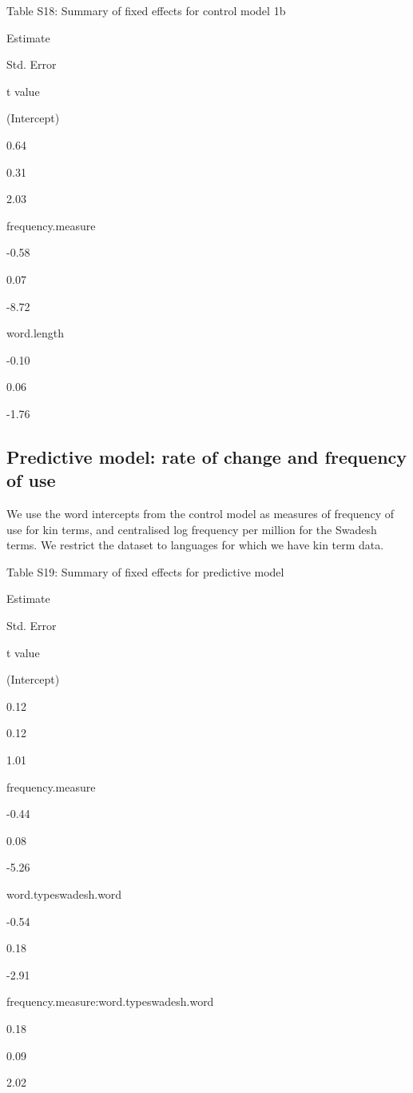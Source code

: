 \documentclass[]{article}
\begin{document}
Table S18: Summary of fixed effects for control model 1b

Estimate

Std. Error

t value

(Intercept)

0.64

0.31

2.03

frequency.measure

-0.58

0.07

-8.72

word.length

-0.10

0.06

-1.76

\subsection{Predictive model: rate of change and frequency of
use}\label{predictive-model-rate-of-change-and-frequency-of-use}

We use the word intercepts from the control model as measures of
frequency of use for kin terms, and centralised log frequency per
million for the Swadesh terms. We restrict the dataset to languages for
which we have kin term data.

Table S19: Summary of fixed effects for predictive model

Estimate

Std. Error

t value

(Intercept)

0.12

0.12

1.01

frequency.measure

-0.44

0.08

-5.26

word.typeswadesh.word

-0.54

0.18

-2.91

frequency.measure:word.typeswadesh.word

0.18

0.09

2.02
\end{document}
